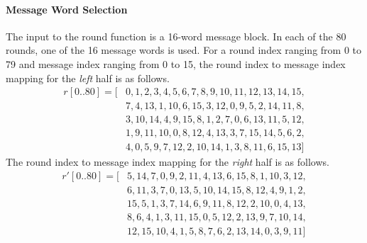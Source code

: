 \documentclass[10pt]{article}
\begin{document}
\paragraph{Message Word Selection}
The input to the round function is a 16-word message block. In each of the 80 rounds, one of the 16 message words is used. For a round index ranging from 0 to 79 and message index ranging from 0 to 15, the round index to message index mapping for the \textit{left} half is as follows. 
\begin{align*}
  r[0..80]  =
    [&0,  1,  2,  3,  4,  5,  6,  7,  8,  9, 10, 11, 12, 13, 14, 15,\\
     &7,  4, 13,  1, 10,  6, 15,  3, 12,  0,  9,  5,  2, 14, 11,  8,\\
     &3, 10, 14,  4,  9, 15,  8,  1,  2,  7,  0,  6, 13, 11,  5, 12,\\
     &1,  9, 11, 10,  0,  8, 12,  4, 13,  3,  7, 15, 14,  5,  6,  2,\\
     &4,  0,  5,  9,  7, 12,  2, 10, 14,  1,  3,  8, 11,  6, 15, 13]
\end{align*}
The round index to message index mapping for the \textit{right} half is as follows.
\begin{align*}
  r'[0..80]  =
   [&5, 14,  7,  0,  9,  2, 11,  4, 13,  6, 15,  8,  1, 10,  3, 12,\\
    &6, 11,  3,  7,  0, 13,  5, 10, 14, 15,  8, 12,  4,  9,  1,  2,\\
    &15,  5,  1,  3,  7, 14,  6,  9, 11,  8, 12,  2, 10,  0,  4, 13,\\
    &8,  6,  4,  1,  3, 11, 15,  0,  5, 12,  2, 13,  9,  7, 10, 14,\\
    &12, 15, 10,  4,  1,  5,  8,  7,  6,  2, 13, 14,  0,  3,  9, 11]
\end{align*}
\end{document}
